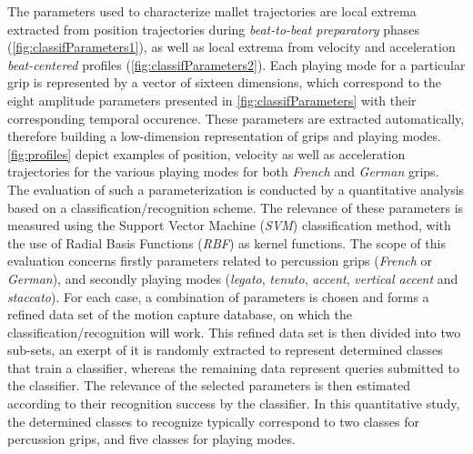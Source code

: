 The parameters used to characterize mallet trajectories are local extrema extracted from position trajectories during \emph{beat-to-beat preparatory} phases (\myfigname \ref{fig:classifParameters1}), as well as local extrema from velocity and acceleration \emph{beat-centered} profiles (\myfigname \ref{fig:classifParameters2}). Each playing mode for a particular grip is represented by a vector of sixteen dimensions, which correspond to the eight amplitude parameters presented in \myfigname \ref{fig:classifParameters} with their corresponding temporal occurence. These parameters are extracted automatically, therefore building a low-dimension representation of grips and playing modes. \myfigname \ref{fig:profiles} depict examples of position, velocity as well as acceleration trajectories for the various playing modes for both \emph{French} and \emph{German} grips.\\ %

The evaluation of such a parameterization is conducted by a quantitative analysis based on a classification/recognition scheme. The relevance of these parameters is measured using the Support Vector Machine (\emph{SVM}) classification method, with the use of Radial Basis Functions (\emph{RBF}) as kernel functions. The scope of this evaluation concerns firstly parameters related to percussion grips (\emph{French} or \emph{German}), and secondly playing modes (\emph{legato}, \emph{tenuto}, \emph{accent}, \emph{vertical accent} and \emph{staccato}). For each case, a combination of parameters is chosen and forms a refined data set of the motion capture database, on which the classification/recognition will work. This refined data set is then divided into two sub-sets, an exerpt of it is randomly extracted to represent determined classes that train a classifier, whereas the remaining data represent queries submitted to the classifier. The relevance of the selected parameters is then estimated according to their recognition success by the classifier. In this quantitative study, the determined classes to recognize typically correspond to two classes for percussion grips, and five classes for playing modes.

